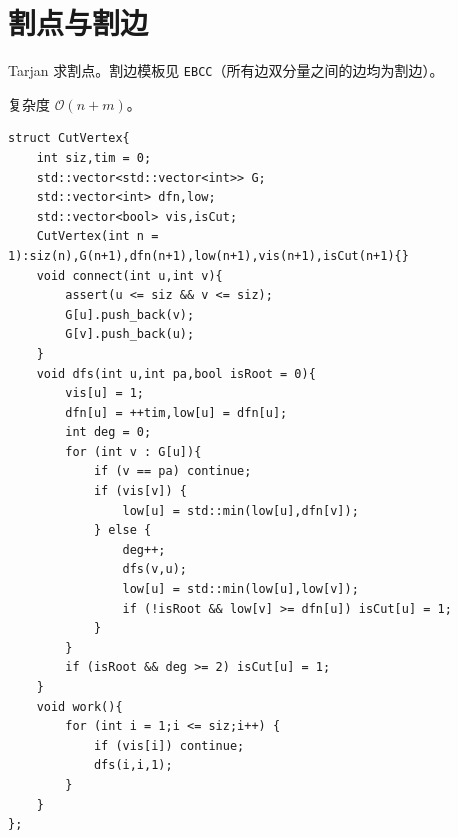 \section{割点与割边}

Tarjan 求割点。割边模板见 \texttt{EBCC}（所有边双分量之间的边均为割边）。

复杂度 $\mathcal{O}(n+m)$。

\begin{lstlisting}
struct CutVertex{
    int siz,tim = 0;
    std::vector<std::vector<int>> G;
    std::vector<int> dfn,low;
    std::vector<bool> vis,isCut;
    CutVertex(int n = 1):siz(n),G(n+1),dfn(n+1),low(n+1),vis(n+1),isCut(n+1){}
    void connect(int u,int v){
        assert(u <= siz && v <= siz);
        G[u].push_back(v);
        G[v].push_back(u);
    }
    void dfs(int u,int pa,bool isRoot = 0){
        vis[u] = 1;
        dfn[u] = ++tim,low[u] = dfn[u];
        int deg = 0;
        for (int v : G[u]){
            if (v == pa) continue;
            if (vis[v]) {
                low[u] = std::min(low[u],dfn[v]);
            } else {
                deg++;
                dfs(v,u);
                low[u] = std::min(low[u],low[v]);
                if (!isRoot && low[v] >= dfn[u]) isCut[u] = 1;
            }
        }
        if (isRoot && deg >= 2) isCut[u] = 1;
    }
    void work(){
        for (int i = 1;i <= siz;i++) {
            if (vis[i]) continue;
            dfs(i,i,1);
        }
    }
};
\end{lstlisting}

